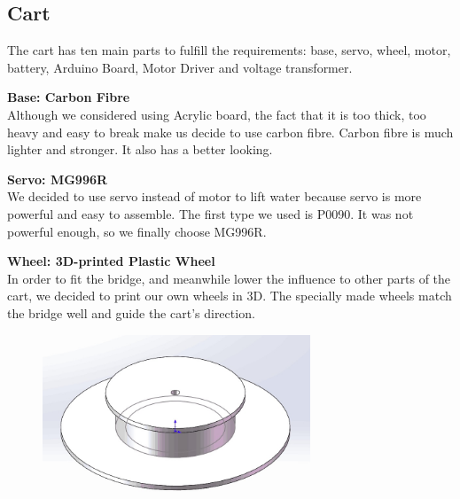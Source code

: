 \subsection{Cart}

The cart has ten main parts to fulfill the requirements: base, servo, wheel,
motor, battery, Arduino Board, Motor Driver and voltage transformer.

\bigskip
\noindent
\textbf{Base: Carbon Fibre} \\
\indent
Although we considered using Acrylic board, the fact that it is too thick, too
heavy and easy to break make us decide to use carbon fibre.
Carbon fibre is much lighter and stronger.
It also has a better looking. 

\bigskip
\noindent
\textbf{Servo: MG996R}  \\
\indent
We decided to use servo instead of motor to lift water because servo is more
powerful and easy to assemble. 
The first type we used is P0090.
It was not powerful enough, so we finally choose MG996R. 

\bigskip
\noindent
\textbf{Wheel: 3D-printed Plastic Wheel } \\
\indent
In order to fit the bridge, and meanwhile lower the influence to other parts of
the cart, we decided to print our own wheels in 3D.
The specially made wheels match the bridge well and guide the cart’s direction.

\begin{figure}[H]
\begin{center}
\includegraphics[width=8cm]{figure/designOverview/p2}
\end{center}
\end{figure}


